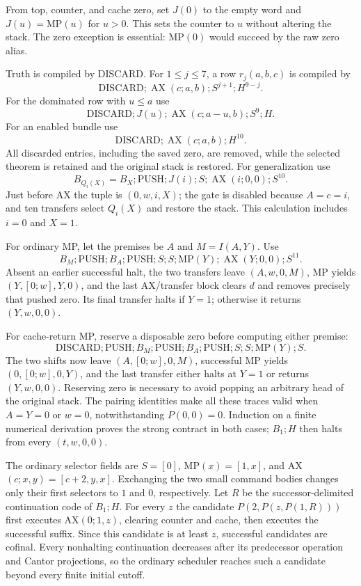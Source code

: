 From top, counter, and cache zero, set $J(0)$ to the empty word and
$J(u)=\mathrm{MP}(u)$ for $u>0$.  This sets the counter to $u$ without
altering the stack.  The zero exception is essential: MP$(0)$ would
succeed by the raw zero alias.

Truth is compiled by DISCARD.  For $1\le j\le7$, a row $r_j(a,b,c)$
is compiled by
\[
 \mathrm{DISCARD};\operatorname{AX}(c;a,b);S^{j+1};H^{9-j}.
\]
For the dominated row with $u\le a$ use
\[
 \mathrm{DISCARD};J(u);\operatorname{AX}(c;a-u,b);S^9;H.
\]
For an enabled bundle use
\[
 \mathrm{DISCARD};\operatorname{AX}(c;a,b);H^{10}.
\]
All discarded entries, including the saved zero, are removed, while the
selected theorem is retained and the original stack is restored.
For generalization use
\[
 B_{Q_i(X)}=B_X;\mathrm{PUSH};J(i);S;\operatorname{AX}(i;0,0);S^{10}.
\]
Just before AX the tuple is $(0,w,i,X)$; the gate is disabled because
$A=c=i$, and ten transfers select $Q_i(X)$ and restore the stack.
This calculation includes $i=0$ and $X=1$.

For ordinary MP, let the premises be $A$ and $M=I(A,Y)$.  Use
\[
 B_M;\mathrm{PUSH};B_A;\mathrm{PUSH};S;S;\mathrm{MP}(Y);
 \operatorname{AX}(Y;0,0);S^{11}.
\]
Absent an earlier successful halt, the two transfers leave
$(A,w,0,M)$, MP yields $(Y,[0;w],Y,0)$, and the last AX/transfer
block clears $d$ and removes precisely that pushed zero.  Its final
transfer halts if $Y=1$; otherwise it returns $(Y,w,0,0)$.

For cache-return MP, reserve a disposable zero before computing either
premise:
\[
 \mathrm{DISCARD};\mathrm{PUSH};B_M;\mathrm{PUSH};B_A;\mathrm{PUSH};
 S;S;\mathrm{MP}(Y);S.
\]
The two shifts now leave $(A,[0;w],0,M)$, successful MP yields
$(0,[0;w],0,Y)$, and the last transfer either halts at $Y=1$ or
returns $(Y,w,0,0)$.  Reserving zero is necessary to avoid popping
an arbitrary head of the original stack.  The pairing identities make
all these traces valid when $A=Y=0$ or $w=0$, notwithstanding
$P(0,0)=0$.  Induction on a finite numerical derivation proves the
strong contract in both cases; $B_1;H$ then halts from every
$(t,w,0,0)$.

The ordinary selector fields are $S=[0]$, MP$(x)=[1,x]$, and
AX$(c;x,y)=[c+2,y,x]$.  Exchanging the two small command bodies
changes only their first selectors to $1$ and $0$, respectively.
Let $R$ be the successor-delimited continuation code of $B_1;H$.
For every $z$ the candidate $P(2,P(z,P(1,R)))$ first executes
AX$(0;1,z)$, clearing counter and cache, then executes the successful
suffix.  Since this candidate is at least $z$, successful candidates
are cofinal.  Every nonhalting continuation decreases after its
predecessor operation and Cantor projections, so the ordinary scheduler
reaches such a candidate beyond every finite initial cutoff.

